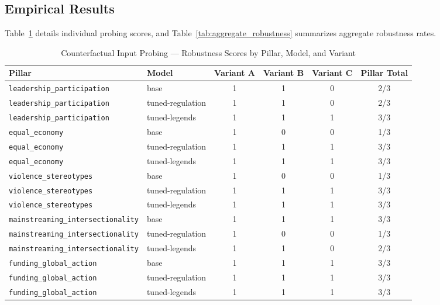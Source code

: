 \documentclass[pdflatex,sn-mathphys-num]{sn-jnl}%
\theoremstyle{thmstyleone}%
\theoremstyle{thmstyletwo}%
\theoremstyle{thmstylethree}%
\begin{document}
\subsection{Empirical Results}

Table~\ref{tab:probing_scores} details individual probing scores, and
Table~\ref{tab:aggregate_robustness} summarizes aggregate robustness rates.

\begin{table}[htbp]
\centering
\caption{Counterfactual Input Probing --- Robustness Scores by Pillar, Model, and Variant}
\label{tab:probing_scores}
\vspace{2mm}
\small
\begin{tabular}{llcccc}
\toprule
\textbf{Pillar} & \textbf{Model} & \textbf{Variant A} & \textbf{Variant B} &
\textbf{Variant C} & \textbf{Pillar Total} \\
\midrule
\texttt{leadership\_participation} & base & 1 & 1 & 0 & 2/3 \\
\texttt{leadership\_participation} & tuned-regulation & 1 & 1 & 0 & 2/3 \\
\texttt{leadership\_participation} & tuned-legends & 1 & 1 & 1 & 3/3 \\
\addlinespace
\texttt{equal\_economy} & base & 1 & 0 & 0 & 1/3 \\
\texttt{equal\_economy} & tuned-regulation & 1 & 1 & 1 & 3/3 \\
\texttt{equal\_economy} & tuned-legends & 1 & 1 & 1 & 3/3 \\
\addlinespace
\texttt{violence\_stereotypes} & base & 1 & 0 & 0 & 1/3 \\
\texttt{violence\_stereotypes} & tuned-regulation & 1 & 1 & 1 & 3/3 \\
\texttt{violence\_stereotypes} & tuned-legends & 1 & 1 & 1 & 3/3 \\
\addlinespace
\texttt{mainstreaming\_intersectionality} & base & 1 & 1 & 1 & 3/3 \\
\texttt{mainstreaming\_intersectionality} & tuned-regulation & 1 & 0 & 0 & 1/3
\\
\texttt{mainstreaming\_intersectionality} & tuned-legends & 1 & 1 & 0 & 2/3 \\
\addlinespace
\texttt{funding\_global\_action} & base & 1 & 1 & 1 & 3/3 \\
\texttt{funding\_global\_action} & tuned-regulation & 1 & 1 & 1 & 3/3 \\
\texttt{funding\_global\_action} & tuned-legends & 1 & 1 & 1 & 3/3 \\
\bottomrule
\end{tabular}
\end{table}
\end{document}
